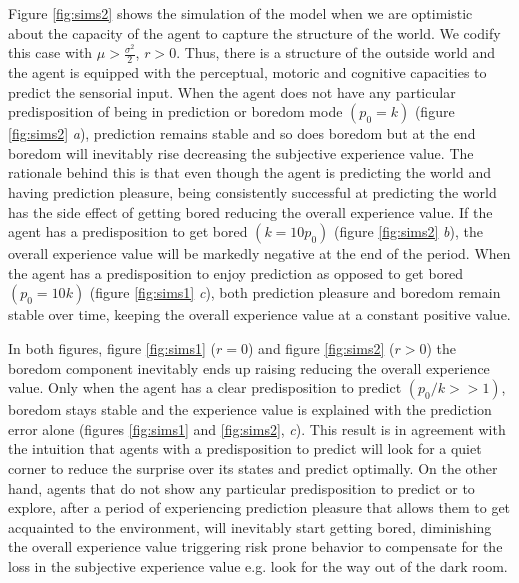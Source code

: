 \documentclass[11pt, onecolumn]{article}
\begin{document}
Figure \ref{fig:sims2} shows the simulation of the model when we are optimistic about the capacity  of the agent to capture the structure of the world. We codify this case with $ \mu > \frac{\sigma ^2}{2}$, $r>0$. Thus, there  is a structure of the outside world and the agent is equipped with the perceptual, motoric and cognitive capacities to predict the sensorial input.
When the agent does not have any particular predisposition of being in prediction or boredom mode $(p_0 = k)$ (figure \ref{fig:sims2} \emph{a}), prediction remains stable and so does boredom but at the end boredom will inevitably rise decreasing the subjective experience value. The rationale behind this is that even though the agent is predicting the world and having prediction pleasure, being consistently successful at predicting the world has the side effect of getting bored reducing the overall experience value. 
If the agent has a predisposition to  get bored $(k = 10p_0)$ (figure \ref{fig:sims2} \emph{b}), the overall experience value will be markedly negative at the end of the period. When the agent has a predisposition to enjoy prediction as opposed to get bored $(p_0 = 10k)$ (figure \ref{fig:sims1} \emph{c}), both prediction pleasure and boredom remain stable over time, keeping the overall experience value at a constant positive value.

In both figures, figure \ref{fig:sims1} ($r=0$) and figure \ref{fig:sims2} ($r>0$)   the boredom component inevitably ends up raising reducing the overall experience value. Only when the agent has a clear predisposition to predict $(p_0/k >> 1)$, boredom stays stable and the experience value is explained with the prediction error alone (figures \ref{fig:sims1} and \ref{fig:sims2}, \emph{c}). This result is in agreement with the intuition that agents with a predisposition to predict will look for a quiet corner to reduce the surprise over its states and predict optimally. On the other hand, agents that do not show any particular predisposition to predict or to explore, after a period of experiencing prediction pleasure that allows them to get acquainted to the environment, will inevitably start getting bored, diminishing the overall experience value triggering risk prone behavior to compensate for the loss in the subjective experience value e.g. look for the way out of the dark room.
\end{document}
